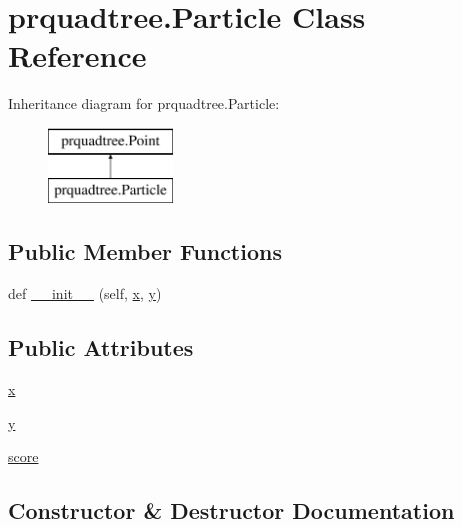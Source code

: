 \hypertarget{classprquadtree_1_1Particle}{}\section{prquadtree.\+Particle Class Reference}
\label{classprquadtree_1_1Particle}
Inheritance diagram for prquadtree.\+Particle\+:\begin{figure}[H]
\begin{center}
\leavevmode
\includegraphics[height=2.000000cm]{classprquadtree_1_1Particle}
\end{center}
\end{figure}
\subsection*{Public Member Functions}
\begin{DoxyCompactItemize}
\item 
def \hyperlink{classprquadtree_1_1Particle_a4508876870d2813145a26fb581ce06f4}{\+\_\+\+\_\+init\+\_\+\+\_\+} (self, \hyperlink{classprquadtree_1_1Particle_a749ee47de3358225c48e7b8d4dc85ded}{x}, \hyperlink{classprquadtree_1_1Particle_ab4bcb8c94d6976d2050749590ad41210}{y})
\end{DoxyCompactItemize}
\subsection*{Public Attributes}
\begin{DoxyCompactItemize}
\item 
\hyperlink{classprquadtree_1_1Particle_a749ee47de3358225c48e7b8d4dc85ded}{x}
\item 
\hyperlink{classprquadtree_1_1Particle_ab4bcb8c94d6976d2050749590ad41210}{y}
\item 
\hyperlink{classprquadtree_1_1Particle_a9fc6fbbd51a3dc21b0dc2531c6c6ff1b}{score}
\end{DoxyCompactItemize}


\subsection{Constructor \& Destructor Documentation}
\hypertarget{classprquadtree_1_1Particle_a4508876870d2813145a26fb581ce06f4}{}
